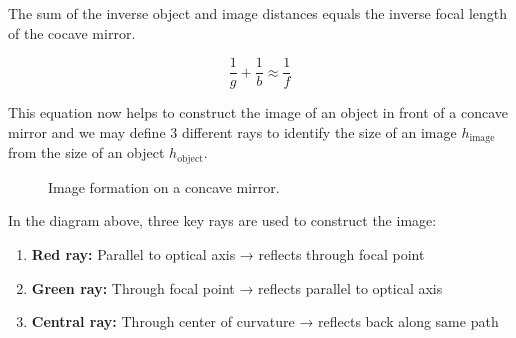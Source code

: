 \documentclass[
  a4paper,
]{book}
\providecommand{\tightlist}{%
  \setlength{\itemsep}{0pt}\setlength{\parskip}{0pt}}
\begin{document}
\begin{tcolorbox}[enhanced jigsaw, coltitle=black, title=\textcolor{quarto-callout-note-color}{\faInfo}\hspace{0.5em}{Imaging Equation Concave Mirror}, colframe=quarto-callout-note-color-frame, toprule=.15mm, opacitybacktitle=0.6, left=2mm, opacityback=0, breakable, toptitle=1mm, bottomtitle=1mm, leftrule=.75mm, arc=.35mm, titlerule=0mm, colbacktitle=quarto-callout-note-color!10!white, rightrule=.15mm, bottomrule=.15mm, colback=white]

The sum of the inverse object and image distances equals the inverse
focal length of the cocave mirror.

\[\frac{1}{g}+\frac{1}{b}\approx\frac{1}{f}\]

\end{tcolorbox}

This equation now helps to construct the image of an object in front of
a concave mirror and we may define 3 different rays to identify the size
of an image \(h_{\text{image}}\) from the size of an object
\(h_{\text{object}}\).

\begin{figure}


\caption{\label{fig-concave-mirror-image}Image formation on a concave
mirror.}

\end{figure}%

In the diagram above, three key rays are used to construct the image:

\begin{enumerate}
\def\labelenumi{\arabic{enumi}.}
\tightlist
\item
  \textbf{Red ray:} Parallel to optical axis → reflects through focal
  point
\item
  \textbf{Green ray:} Through focal point → reflects parallel to optical
  axis
\item
  \textbf{Central ray:} Through center of curvature → reflects back
  along same path
\end{enumerate}
\end{document}

